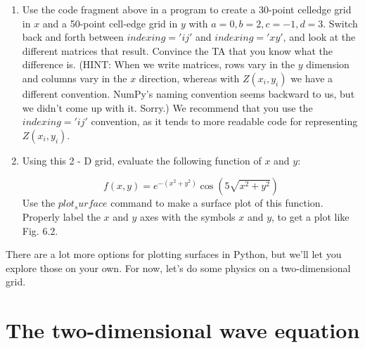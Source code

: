 \begin{problem}\label{P6.1} 

\begin{enumerate}[label=(\alph*)]
\item
Use the code fragment above in a program to create a 30-point celledge grid in $x$ and a 50-point cell-edge grid in $y$ with $a = 0, b = 2,
c = −1, d = 3$. Switch back and forth between $indexing='ij'$ and
$indexing='xy'$, and look at the different matrices that result. Convince the TA that you know what the difference is. (HINT: When
we write matrices, rows vary in the $y$ dimension and columns vary
in the $x$ direction, whereas with $Z(x_i, y_i)$ we have a different convention. NumPy\rq s naming convention seems backward to us, but
we didn\rq t come up with it. Sorry.) We recommend that you use the
$indexing='ij'$ convention, as it tends to more readable code for representing $Z(x_i, y_i)$.
\item  Using this 2 - D grid, evaluate the following function of $x$ and $y$:

\begin{equation}\label{eq:61}
f(x,y) = e^{-(x^2+y^2)} \cos(5\sqrt{x^2+y^2})
\end{equation}
Use the $plot_surface$ command to make a surface plot of this function. Properly label the $x$ and $y$ axes with the symbols $x$ and $y$, to get
a plot like Fig. 6.2.
\end{enumerate}\end{problem}
There are a lot more options for plotting surfaces in Python, but we\rq ll let you
explore those on your own. For now, let\rq s do some physics on a two-dimensional
grid.
\section*{The two-dimensional wave equation}



